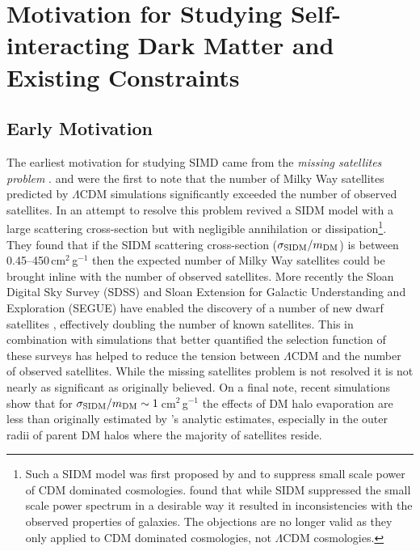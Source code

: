 \section{Motivation for Studying Self-interacting Dark Matter and Existing Constraints}

\subsection{Early Motivation}

The earliest motivation for studying SIMD came from the \textit{missing satellites problem} \citep[see][for a thorough review]{Bullock:2010uv}.
\citet{Moore:1999ja} and \citet{Klypin:1999ej} were the first to note that the number of Milky Way satellites predicted by $\Lambda$CDM simulations significantly exceeded the number of observed satellites.
In an attempt to resolve this problem \citet{Spergel:2000cb} revived a SIDM model with a large scattering cross-section but with negligible annihilation or dissipation\footnote{Such a SIDM model was first proposed by \citet{Carlson:1992cp} and \citet{Machacek:1994kj} to suppress small scale power of CDM dominated cosmologies.  \citet{deLaix:1995ey} found that while SIDM suppressed the small scale power spectrum in a desirable way it resulted in inconsistencies with the observed properties of galaxies.  The \citet{deLaix:1995ey} objections are no longer valid as they only applied to CDM dominated cosmologies, not $\Lambda$CDM cosmologies.}. 
They found that if the SIDM scattering cross-section ($\sigma_{\rm SIDM}/m_{\rm DM}$) is between 0.45--450\,cm$^2$\,g$^{-1}$ then the expected number of Milky Way satellites could be brought inline with the number of observed satellites.
More recently the Sloan Digital Sky Survey (SDSS) and Sloan Extension for Galactic Understanding and Exploration (SEGUE) have enabled the discovery of a number of new dwarf satellites \citep[see][for a review]{Willman:2010fg}, effectively doubling the number of known satellites.
This in combination with simulations that better quantified the selection function of these surveys has helped to reduce the tension between $\Lambda$CDM and the number of observed satellites.
While the missing satellites problem is not resolved it is not nearly as significant as originally believed.
On a final note, recent simulations \citep{Rocha:2012tr} show that for $\sigma_{\rm SIDM}/m_{\rm DM} \sim 1$\,cm$^2$\,g$^{-1}$ the effects of DM halo evaporation are less than originally estimated by \citet{Spergel:2000cb}'s analytic estimates, especially in the outer radii of parent DM halos where the majority of satellites reside.

